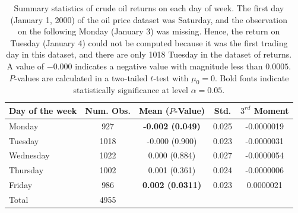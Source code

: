 \documentclass[12pt]{article}
\begin{document}
	\begin{table}[H]
		\small
		\centering
		\begin{tabular}{l|c c c c}
			\toprule
			Day of the week & Num. Obs. & Mean ($P$-Value) & Std. & $3^{rd}$ Moment \\
			\midrule
			Monday & 927 & \textbf{-0.002 (0.049)} & 0.025 & -0.0000019 \\
			Tuesday & 1018 & -0.000 (0.900) & 0.023 & -0.0000031 \\
			Wednesday & 1022 & 0.000 (0.884) & 0.027 & -0.0000054 \\
			Thursday & 1002 & 0.001 (0.361) & 0.024 & -0.0000006 \\
			Friday & 986 & \textbf{0.002 (0.0311)} & 0.023 & 0.0000021 \\
			\midrule
			Total & 4955 & & & \\
			\bottomrule
		\end{tabular}
		\caption{Summary statistics of crude oil returns on each day of week. The first day (January 1, 2000) of the oil price dataset was Saturday, and the observation on the following Monday (January 3) was missing. Hence, the return on Tuesday (January 4) could not be computed because it was the first trading day in this dataset, and there are only 1018 Tuesday in the dataset of returns. A value of $-0.000$ indicates a negative value with magnitude less than $0.0005$. $P$-values are calculated in a two-tailed $t$-test with $\mu_0 = 0$. Bold fonts indicate statistically significance at level $\alpha=0.05$.}
	\end{table}
	
\end{document}
